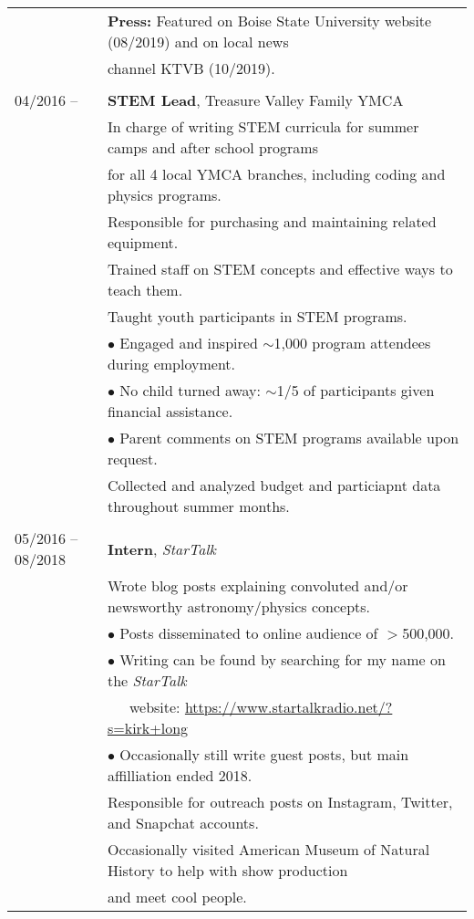 \documentclass[11pt]{article}
\begin{document}
\begin{tabular}{ll}
      & \textbf{Press:} Featured on Boise State University website (08/2019) and on local news \\
      & channel KTVB (10/2019). \\
      & \\
04/2016 --    &   \textbf{STEM Lead}, Treasure Valley Family YMCA \vspace{1mm} \\
      & In charge of writing STEM curricula for summer camps and after school programs \\
      & for all 4 local YMCA branches, including coding and physics programs. \vspace{0.5mm}\\
      & Responsible for purchasing and maintaining related equipment. \vspace{0.5mm}\\
      & Trained staff on STEM concepts and effective ways to teach them. \vspace{0.5mm} \\
      & Taught youth participants in STEM programs. \\
      & $\bullet$ Engaged and inspired $\sim$1,000 program attendees during employment. \\
      & $\bullet$ No child turned away: $\sim$1/5 of participants given financial assistance. \\
      & $\bullet$ Parent comments on STEM programs available upon request. \vspace{1mm} \\
      & Collected and analyzed budget and particiapnt data throughout summer months. \\
      & \\
05/2016 -- 08/2018    &   \textbf{Intern}, \textit{StarTalk} \vspace{1mm} \\
      & Wrote blog posts explaining convoluted and/or newsworthy astronomy/physics concepts. \\
      & $\bullet$ Posts disseminated to online audience of $>$500,000. \\
      & $\bullet$ Writing can be found by searching for my name on the \textit{StarTalk} \\
      & \-\ \-\ \-\ website: \url{https://www.startalkradio.net/?s=kirk+long} \\
      & $\bullet$ Occasionally still write guest posts, but main affilliation ended 2018. \vspace{1mm} \\
      & Responsible for outreach posts on Instagram, Twitter, and Snapchat accounts. \\
      & Occasionally visited American Museum of Natural History to help with show production \\
      & and meet cool people. \\

\end{tabular}
\end{document}
